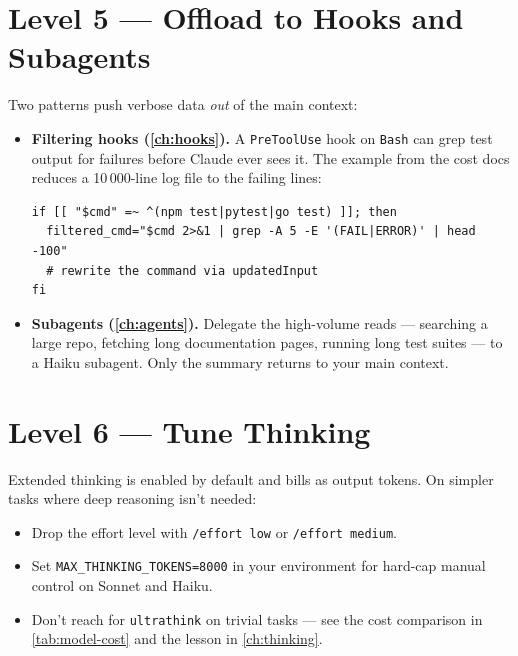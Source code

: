 \section{Level 5 — Offload to Hooks and Subagents}
\label{sec:cost-offload}


Two patterns push verbose data \emph{out} of the main context:

\begin{itemize}
  \item \textbf{Filtering hooks (\cref{ch:hooks}).} A \texttt{PreToolUse}
        hook on \texttt{Bash} can grep test output for failures before
        Claude ever sees it. The example from the cost docs reduces a
        10\,000-line log file to the failing lines:
\begin{verbatim}
if [[ "$cmd" =~ ^(npm test|pytest|go test) ]]; then
  filtered_cmd="$cmd 2>&1 | grep -A 5 -E '(FAIL|ERROR)' | head -100"
  # rewrite the command via updatedInput
fi
\end{verbatim}
  \item \textbf{Subagents (\cref{ch:agents}).} Delegate the high-volume
        reads — searching a large repo, fetching long documentation
        pages, running long test suites — to a Haiku subagent. Only the
        summary returns to your main context.
\end{itemize}

\section{Level 6 — Tune Thinking}
\label{sec:cost-thinking}


Extended thinking is enabled by default and bills as output tokens. On
simpler tasks where deep reasoning isn't needed:

\begin{itemize}
  \item Drop the effort level with \texttt{/effort low} or
        \texttt{/effort medium}.
  \item Set \texttt{MAX\_THINKING\_TOKENS=8000} in your environment
        for hard-cap manual control on Sonnet and Haiku.
  \item Don't reach for \texttt{ultrathink} on trivial tasks — see the
        cost comparison in \cref{tab:model-cost} and the lesson in
        \cref{ch:thinking}.
\end{itemize}

